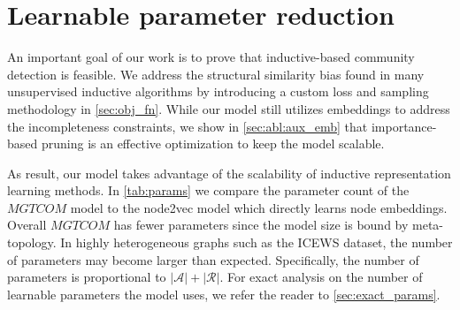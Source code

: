 



\section{Learnable parameter reduction}
An important goal of our work is to prove that inductive-based community detection is feasible.
We address the structural similarity bias found in many unsupervised inductive algorithms by introducing a custom loss and sampling methodology in \cref{sec:obj_fn}.
While our model still utilizes embeddings to address the incompleteness constraints, we show in \cref{sec:abl:aux_emb} that importance-based pruning is an effective optimization to keep the model scalable.

As result, our model takes advantage of the scalability of inductive representation learning methods.
In \cref{tab:params} we compare the parameter count of the $MGTCOM$ model to the node2vec model which directly learns node embeddings.
Overall $MGTCOM$ has fewer parameters since the model size is bound by meta-topology.
In highly heterogeneous graphs such as the ICEWS dataset, the number of parameters may become larger than expected.
Specifically, the number of parameters is proportional to $|\mathcal{A}| + |\mathcal{R}|$.
For exact analysis on the number of learnable parameters the model uses, we refer the reader to \cref{sec:exact_params}. 

